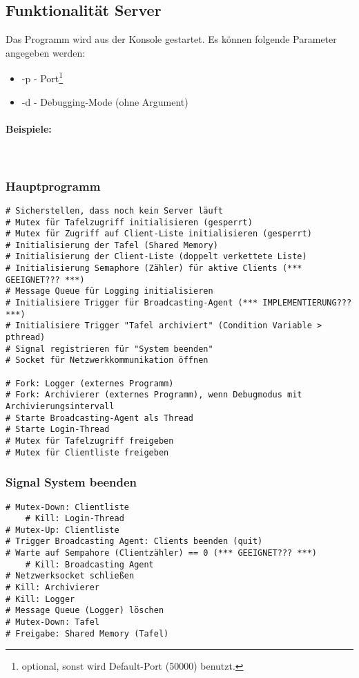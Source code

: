 \subsection{Funktionalität Server}
Das Programm wird aus der Konsole gestartet. Es können folgende Parameter angegeben werden:
\begin{itemize}
	\item -p - Port\footnote{optional, sonst wird Default-Port (50000) benutzt.}
	\item -d - Debugging-Mode (ohne Argument)
\end{itemize}

\paragraph*{Beispiele: \\}
 \\

\subsubsection{Hauptprogramm}
\begin{lstlisting}
# Sicherstellen, dass noch kein Server läuft
# Mutex für Tafelzugriff initialisieren (gesperrt)
# Mutex für Zugriff auf Client-Liste initialisieren (gesperrt)
# Initialisierung der Tafel (Shared Memory)
# Initialisierung der Client-Liste (doppelt verkettete Liste)
# Initialisierung Semaphore (Zähler) für aktive Clients (*** GEEIGNET??? ***)
# Message Queue für Logging initialisieren
# Initialisiere Trigger für Broadcasting-Agent (*** IMPLEMENTIERUNG??? ***)
# Initialisiere Trigger "Tafel archiviert" (Condition Variable > pthread)
# Signal registrieren für "System beenden"
# Socket für Netzwerkkommunikation öffnen

# Fork: Logger (externes Programm)
# Fork: Archivierer (externes Programm), wenn Debugmodus mit Archivierungsintervall
# Starte Broadcasting-Agent als Thread
# Starte Login-Thread
# Mutex für Tafelzugriff freigeben
# Mutex für Clientliste freigeben
\end{lstlisting}

\subsubsection{Signal System beenden}
\begin{lstlisting}
# Mutex-Down: Clientliste
    # Kill: Login-Thread
# Mutex-Up: Clientliste
# Trigger Broadcasting Agent: Clients beenden (quit)
# Warte auf Sempahore (Clientzähler) == 0 (*** GEEIGNET??? ***)
    # Kill: Broadcasting Agent
# Netzwerksocket schließen
# Kill: Archivierer
# Kill: Logger
# Message Queue (Logger) löschen
# Mutex-Down: Tafel
# Freigabe: Shared Memory (Tafel)
\end{lstlisting}

